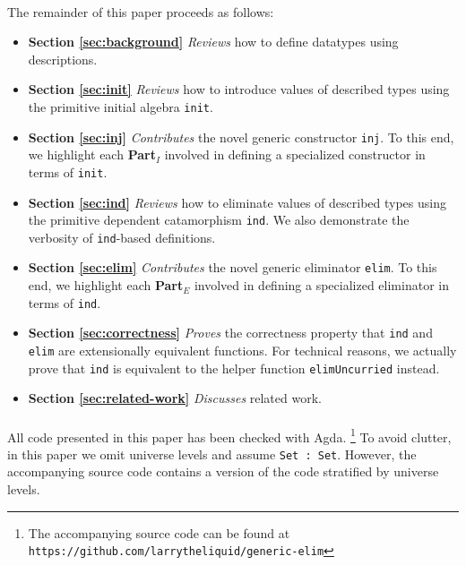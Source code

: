 \documentclass[preprint,nonatbib]{sigplanconf}
\newcommand{\refsec}[1]{Section \ref{sec:#1}}
\begin{document}
\paragraph{}
The remainder of this paper proceeds as follows:

\begin{itemize}
\item{\bf{\refsec{background}}}
{\it Reviews} how to define datatypes using descriptions.

\item{\bf{\refsec{init}}}
{\it Reviews} how to introduce values of described types using the
primitive initial algebra {\tt init}.

\item{\bf{\refsec{inj}}}
{\it Contributes} the novel generic constructor {\tt inj}. To this
end, we highlight each {\bf Part$_I$} involved in defining a specialized
constructor in terms of {\tt init}.

\item{\bf{\refsec{ind}}}
{\it Reviews} how to eliminate values of described types using the
primitive dependent catamorphism {\tt ind}. We also demonstrate
the verbosity of {\tt ind}-based definitions.

\item{\bf{\refsec{elim}}}
{\it Contributes} the novel generic eliminator {\tt elim}. To this
end, we highlight each {\bf Part$_E$} involved in defining a specialized
eliminator in terms of {\tt ind}.

\item{\bf{\refsec{correctness}}}
{\it Proves} the correctness property that {\tt ind} and {\tt elim}
are extensionally equivalent functions. For technical reasons, we actually prove that
{\tt ind} is equivalent to the helper function {\tt elimUncurried} instead.

\item{\bf{\refsec{related-work}}}
{\it Discusses} related work.

\end{itemize}

\paragraph{}
All code presented in this paper has been checked with {\sc Agda}.
\footnote{\raggedright{The accompanying source code can be found at
{\tt https://github.com/larrytheliquid/generic-elim}}}
To avoid clutter, in this paper we omit universe levels and assume
{\tt Set : Set}. However, the accompanying source code contains a
version of the code stratified by universe levels.
\end{document}
